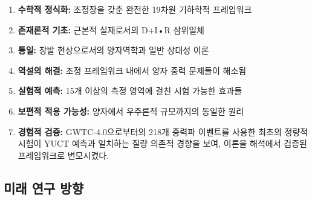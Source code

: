\documentclass[11pt,a4paper]{article}
\theoremstyle{remark}
\begin{document}
	\begin{enumerate}
		\item \textbf{수학적 정식화:} 조정장을 갖춘 완전한 19차원 기하학적 프레임워크
		
		\item \textbf{존재론적 기초:} 근본적 실재로서의 D+I•R 삼위일체
		
		\item \textbf{통일:} 창발 현상으로서의 양자역학과 일반 상대성 이론
		
		\item \textbf{역설의 해결:} 조정 프레임워크 내에서 양자 중력 문제들이 해소됨
		
		\item \textbf{실험적 예측:} 15개 이상의 측정 영역에 걸친 시험 가능한 효과들
		
		\item \textbf{보편적 적용 가능성:} 양자에서 우주론적 규모까지의 동일한 원리
		
		\item \textbf{경험적 검증:} GWTC-4.0으로부터의 218개 중력파 이벤트를 사용한 최초의 정량적 시험이 YUCT 예측과 일치하는 질량 의존적 경향을 보여, 이론을 해석에서 검증된 프레임워크로 변모시켰다.
	\end{enumerate}
	
	\subsection{미래 연구 방향}
	
\end{document}
